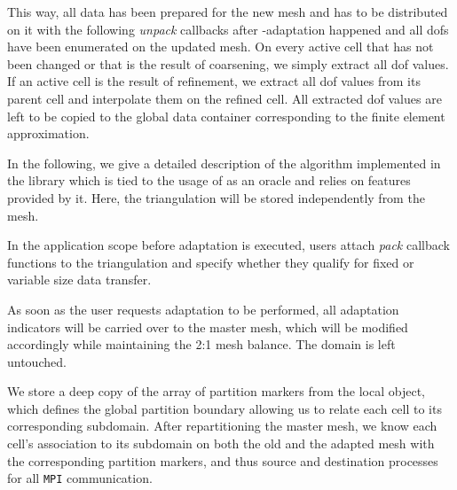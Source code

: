 This way, all data has been prepared for the new mesh and has to be distributed on it with the following \textit{unpack} callbacks after \hp-adaptation happened and all \glspl{dof} have been enumerated on the updated mesh. On every active cell that has not been changed or that is the result of coarsening, we simply extract all \gls{dof} values. If an active cell is the result of refinement, we extract all \gls{dof} values from its parent cell and interpolate them on the refined cell. All extracted \gls{dof} values are left to be copied to the global data container corresponding to the finite element approximation.

In the following, we give a detailed description of the algorithm implemented in the \dealii{} library which is tied to the usage of \pforest{} as an oracle and relies on features provided by it. Here, the \dealii{} triangulation will be stored independently from the \pforest{} mesh.

In the application scope before adaptation is executed, users attach \textit{pack} callback functions to the triangulation and specify whether they qualify for fixed or variable size data transfer.

As soon as the user requests adaptation to be performed, all adaptation indicators will be carried over to the \pforest{} master mesh, which will be modified accordingly while maintaining the 2:1 mesh balance. The \dealii{} domain is left untouched.

We store a deep copy of the array of partition markers \parencite{burstedde2018} from the local \pforest{} object, which defines the global partition boundary allowing us to relate each cell to its corresponding subdomain. After repartitioning the \pforest{} master mesh, we know each cell's association to its subdomain on both the old and the adapted mesh with the corresponding partition markers, and thus source and destination processes for all \texttt{MPI} communication.



